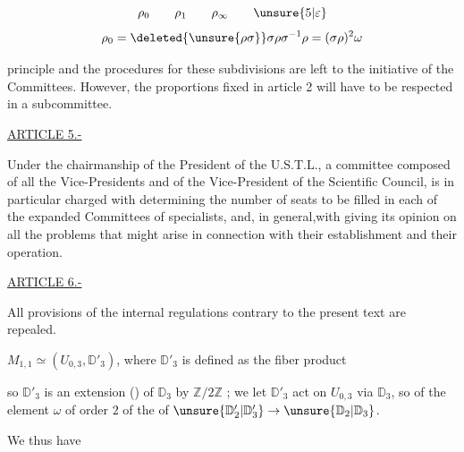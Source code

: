 \[
\rho_0\qquad\rho_1\qquad\rho_\infty\qquad\unsure{5|\varepsilon}
\]
\[
\rho_0=\deleted{\unsure{\rho\sigma}}\sigma\rho\sigma^{-1}\rho
=(\sigma\rho)^2\omega
\]

principle and the procedures for these subdivisions are left to the initiative of the
Committees. However, the proportions fixed in article 2 will have to be respected
in a subcommittee.

\uline{ARTICLE 5.-}

Under the chairmanship of the President of the U.S.T.L., a committee composed
of all the Vice-Presidents and of the Vice-President of the Scientific Council, is
in particular charged with determining the number of seats to be filled in each
of the expanded Committees of specialists, and, in general,with
giving its opinion on all the problems that might arise in connection
with their establishment and their operation.

\uline{ARTICLE 6.-}

All provisions of the internal regulations contrary to the present text
are repealed.


$M_{1,1}\simeq (U_{0,3},\mathbb D'_3)$, where $\mathbb D'_3$ is defined as the fiber product



so $\mathbb D'_3$ is an extension () of $\mathbb D_3$ by $\mathbb Z/2\mathbb Z$ ;  we let $\mathbb D'_3$ act on $U_{0,3}$ via $\mathbb D_3$, so  of the element $\omega$ of order $2$ of the  of $\unsure{\mathbb D'_2|\mathbb D'_3}\to\unsure{\mathbb D_2|\mathbb D_3}$.

We thus have


